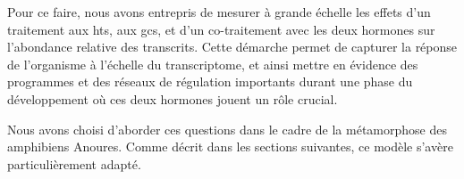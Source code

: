 \documentclass[../main.tex]{subfiles}
\begin{document}
		\par
		Pour ce faire, nous avons entrepris de mesurer à grande échelle les effets d'un traitement aux \glspl{ht}, aux \glspl{gc}, et d'un co-traitement avec les deux hormones sur l'abondance relative des transcrits.
		Cette démarche permet de capturer la réponse de l'organisme à l'échelle du transcriptome, et ainsi mettre en évidence des programmes et des réseaux de régulation importants durant une phase du développement où ces deux hormones jouent un rôle crucial.
		\par
		Nous avons choisi d'aborder ces questions dans le cadre de la métamorphose des amphibiens Anoures.
		Comme décrit dans les sections suivantes, ce modèle s'avère particulièrement adapté.



\end{document}
